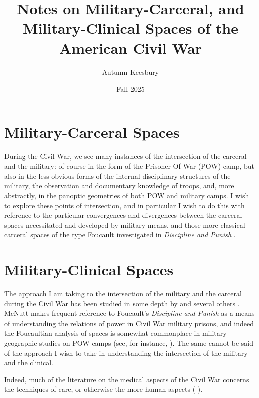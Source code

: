 \documentclass{article}
\title{Notes on Military-Carceral, and Military-Clinical Spaces of the American Civil War}
\author{Autumn Keesbury}
\date{Fall 2025}
\begin{document}
  \maketitle
  \thispagestyle{empty}
  \newpage
  \pagestyle{fancy}

  \section*{Military-Carceral Spaces}
  During the Civil War, we see many instances of the intersection of the carceral and the military: of course in the form of the Prisoner-Of-War (POW) camp,
  but also in the less obvious forms of the internal disciplinary structures of the military, the observation and documentary knowledge of troops, and, more
  abstractly, in the panoptic geometries of both POW and military camps. I wish to explore these points of intersection, and in particular I wish to do this
  with reference to the particular convergences and divergences between the carceral spaces necessitated and developed by military means, and those more
  classical carceral spaces of the type Foucault investigated in \textit{Discipline and Punish} \autocite{Foucault1995}.

  \section*{Military-Clinical Spaces}
  The approach I am taking to the intersection of the military and the carceral during the Civil War has been studied in some depth by \citeauthor{McNutt2024}
  and several others \autocites{McNutt2024}{McNutt2021}{McNutt2019}{McNutt2019a}. McNutt makes frequent reference to Foucault's \textit{Discipline and Punish} as a 
  means of understanding the relations of power in Civil War military prisons, and indeed the Foucaultian analysis of spaces is somewhat commonplace in military-geographic studies on POW camps (see, for instance, \citeauthor{Moran2022}). The same cannot be said of the approach I wish to take in understanding the
  intersection of the military and the clinical.

  Indeed, much of the literature on the medical aspects of the Civil War concerns the techniques of care, or otherwise the more human aspects 
  (\citeauthor{Devine2016} ).

  \newpage
  \nocite{*}
  \printbibliography
\end{document}
